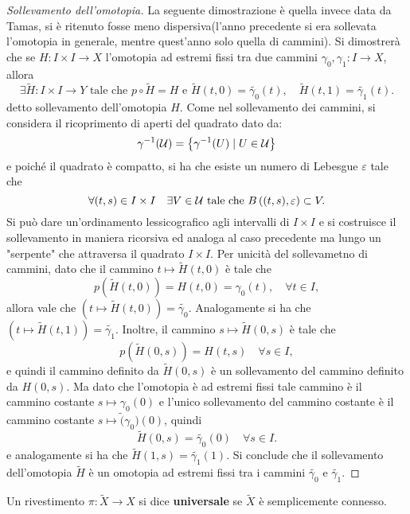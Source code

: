 \documentclass[]{article}
\begin{document}
\begin{proof} [Sollevamento dell'omotopia] \nl
    La seguente dimostrazione \`e quella invece data da Tamas, si \`e ritenuto fosse meno dispersiva(l'anno precedente si era sollevata l'omotopia in generale, mentre quest'anno solo quella di cammini). \nl
    Si dimostrer\`a che se $H: I \times I \to X$ l'omotopia ad estremi fissi tra due cammini $\gamma_0, \gamma_1: I \to X$, allora
    \[
        \exists \tilde{H}: I \times I \to Y \text{ tale che } p \circ \tilde{H} = H \text{ e } \tilde{H}(t, 0) = \tilde{\gamma_0}(t), \quad \tilde{H}(t, 1) = \tilde{\gamma_1}(t). 
    \]
    detto sollevamento dell'omotopia $H$. \nl
    Come nel sollevamento dei cammini, si considera il ricoprimento di aperti del quadrato dato da:
    \[
        \gamma^{-1}(\mathcal{U}) = \left\{ \gamma^{-1}(U) \mid U \in \mathcal{U} \right\}
    \]
    e poich\'e il quadrato \`e compatto, si ha che esiste un numero di Lebesgue $\varepsilon$ tale che
    \[
        \forall (t, s) \in I \times I \quad \exists V \in \mathcal{U} \text{ tale che } B\left((t, s), \varepsilon\right) \subset V.
    \]
    Si pu\`o dare un'ordinamento lessicografico agli intervalli di $I \times I$ e si costruisce il sollevamento in maniera
    ricorsiva ed analoga al caso precedente ma lungo un "serpente" che attraversa il quadrato $I \times I$. \nl
    Per unicit\`a del sollevametno di cammini, dato che il cammino $t \mapsto \tilde{H}(t, 0)$ \`e tale che
    \[
        p(\tilde{H}(t, 0)) = H(t, 0) = \gamma_0(t), \quad \forall t \in I,
    \]
    allora vale che $(t \mapsto \tilde{H}(t, 0)) = \tilde{\gamma_0}$.
    Analogamente si ha che $(t \mapsto \tilde{H}(t, 1)) = \tilde{\gamma_1}$. \nl
    Inoltre, il cammino $s \mapsto \tilde{H}(0, s)$ \`e tale che  
    \[
        p(\tilde{H}(0, s)) = H(t, s) \quad \forall s \in I,
    \]
    e quindi il cammino definito da $\tilde{H}(0, s)$ \`e un sollevamento del cammino definito da $H(0, s)$. \nl
    Ma dato che l'omotopia \`e ad estremi fissi tale cammino \`e il cammino costante $ s \mapsto \gamma_0(0)$ e l'unico sollevamento del cammino
    costante \`e il cammino costante $s \mapsto \tilde(\gamma_0)(0)$, quindi
    \[
        \tilde{H}(0, s) = \tilde{\gamma_0}(0) \quad \forall s \in I.
    \]
    e analogamente si ha che $\tilde{H}(1, s) = \tilde{\gamma_1}(1)$. \nl
    Si conclude che il sollevamento dell'omotopia $\tilde{H}$ \`e un omotopia ad estremi fissi tra i cammini $\tilde{\gamma_0}$ e $\tilde{\gamma_1}$.
\end{proof}

\begin{definition}  \nl
    Un rivestimento $\pi: \tilde{X} \to X$ si dice \textbf{universale} se $\tilde{X}$ \`e semplicemente connesso.
\end{definition}
\end{document}
